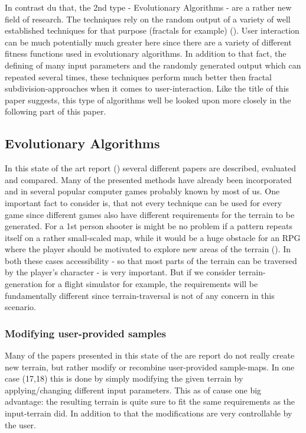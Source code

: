 In contrast du that, the 2nd type - Evolutionary Algorithms - are a rather new field of research. The techniques rely on the random output of a variety of well established techniques for that purpose (fractals for example) (). User interaction can be much potentially much greater here since there are a variety of different fitness functions used in evolutionary algorithms. In addition to that fact, the defining of many input parameters and the randomly generated output which can repeated several times, these techniques perform much better then fractal subdivision-approaches when it comes to user-interaction. Like the title of this paper suggests, this type of algorithms well be looked upon more closely in the following part of this paper.

\subsection{Evolutionary Algorithms}
In this state of the art report () several different papers are described, evaluated and compared. Many of the presented methods have already been incorporated and in several popular computer games probably known by most of us. One important fact to consider is, that not every technique can be used for every game since different games also have different requirements for the terrain to be generated. For a 1st person shooter is might be no problem if a pattern repeats itself on a rather small-scaled map, while it would be a huge obstacle for an RPG where the player should be motivated to explore new areas of the terrain (). In both these cases accessibility - so that most parts of the terrain can be traversed by the player’s character - is very important. But if we consider terrain-generation for a flight simulator for example, the requirements will be fundamentally different since terrain-traversal is not of any concern in this scenario.

\subsubsection{Modifying user-provided samples}
Many of the papers presented in this state of the are report do not really create new terrain, but rather modify or recombine user-provided sample-maps. In one case (17,18) this is done by simply modifying the given terrain by applying/changing different input parameters. This as of cause one big advantage: the resulting terrain is quite sure to fit the same requirements as the input-terrain did. In addition to that the modifications are very controllable by the user.

